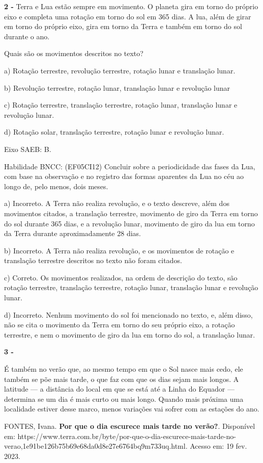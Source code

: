 \textbf{2 -} Terra e Lua estão sempre em movimento. O planeta gira em
torno do próprio eixo e completa uma rotação em torno do sol em 365
dias. A lua, além de girar em torno do próprio eixo, gira em torno da
Terra e também em torno do sol durante o ano.

Quais são os movimentos descritos no texto?

a) Rotação terrestre, revolução terrestre, rotação lunar e translação
lunar.

b) Revolução terrestre, rotação lunar, translação lunar e revolução
lunar

c) Rotação terrestre, translação terrestre, rotação lunar, translação
lunar e revolução lunar.

d) Rotação solar, translação terrestre, rotação lunar e revolução lunar.

Eixo SAEB: B.

Habilidade BNCC: (EF05CI12) Concluir sobre a periodicidade das fases da
Lua, com base na observação e no registro das formas aparentes da Lua no
céu ao longo de, pelo menos, dois meses.

a) Incorreto. A Terra não realiza revolução, e o texto descreve, além
dos movimentos citados, a translação terrestre, movimento de giro da
Terra em torno do sol durante 365 dias, e a revolução lunar, movimento
de giro da lua em torno da Terra durante aproximadamente 28 dias.

b) Incorreto. A Terra não realiza revolução, e os movimentos de rotação
e translação terrestre descritos no texto não foram citados.

c) Correto. Os movimentos realizados, na ordem de descrição do texto,
são rotação terrestre, translação terrestre, rotação lunar, translação
lunar e revolução lunar.

d) Incorreto. Nenhum movimento do sol foi mencionado no texto, e, além
disso, não se cita o movimento da Terra em torno do seu próprio eixo, a
rotação terrestre, e nem o movimento de giro da lua em torno do sol, a
translação lunar.

\textbf{3 -}

É também no verão que, ao mesmo tempo em que o Sol nasce mais cedo, ele
também se põe mais tarde, o que faz com que os dias sejam mais longos. A
latitude --- a distância do local em que se está até a Linha do Equador
--- determina se um dia é mais curto ou mais longo. Quando mais próxima
uma localidade estiver desse marco, menos variações vai sofrer com as
estações do ano.

FONTES, Ivana. \textbf{Por que o dia escurece mais tarde no verão?}.
Disponível em:
https://www.terra.com.br/byte/por-que-o-dia-escurece-mais-tarde-no-verao,1e91be126b75b69e68da0d8e27e6764bq9m733uq.html.
Acesso em: 19 fev. 2023.

